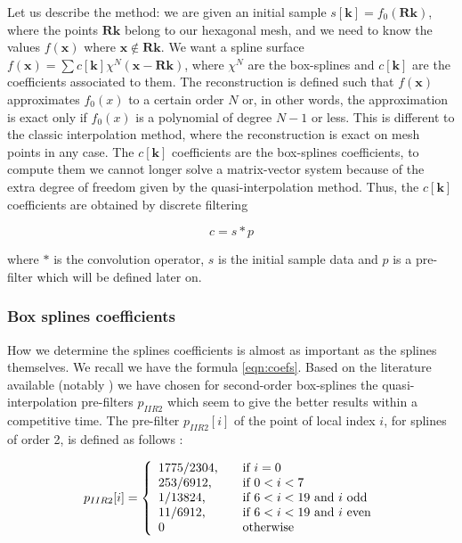 \documentclass[proc]{edpsmath}
\begin{document}
Let us describe the method: we are given an initial sample $s[\mathbf{k}] = f_0(\mathbf{R} \mathbf{k})$, where the points $\mathbf{R} \mathbf{k}$ belong to our hexagonal mesh, and we need to know the values $f(\mathbf{x})$ where $\mathbf{x} \notin \mathbf{R} \mathbf{k}$. We want a spline surface $f(\mathbf{x}) = \sum c[\mathbf{k}] \chi^N(\mathbf{x} - \mathbf{R}\mathbf{k})$, where $\chi^N$ are the box-splines and $c[\mathbf{k}]$ are the coefficients associated to them. The reconstruction is defined such that $f(\mathbf{x})$ approximates $f_0(x)$ to a certain order $N$ or, in other words, the approximation is exact only if $f_0(x)$ is a polynomial of degree $N-1$ or less. This is different to the classic interpolation method, where the reconstruction is exact on mesh points in any case. The $c[\mathbf{k}]$ coefficients are the box-splines coefficients, to compute them we cannot longer solve a matrix-vector system because of the extra degree of freedom given by the quasi-interpolation method. Thus, the  $c[\mathbf{k}]$ coefficients are obtained by discrete filtering\cite{Condat2006a}

\begin{equation}
\label{eqn:coefs}
 c = s * p
\end{equation}

where $*$ is the convolution operator, $s$ is the initial sample data and $p$ is a pre-filter which will be defined later on.


\subsubsection{Box splines coefficients}

How we determine the splines coefficients is almost as important as the splines themselves. We recall we have the formula \eqref{eqn:coefs}. Based on the literature available (notably \cite{Condat2007}) we have chosen for second-order box-splines the quasi-interpolation pre-filters $p_{IIR2}$ which seem to give the better results within a competitive time. The pre-filter $p_{IIR2}[i]$ of the point of local index $i$, for splines of order 2, is defined as follows : 


\begin{equation}
\label{eqn:filterIIR2}
p_{IIR2} [i] = \left\{
  \begin{array}{l l}
    1775/2304\text{,} & \quad \text{if } i = 0\\
    253/6912\text{,} & \quad \text{if } 0<i<7\\
    1/13824\text{,} & \quad \text{if } 6<i<19 \text{ and $i$ odd}\\
    11/6912\text{,} & \quad \text{if } 6<i<19 \text{ and $i$ even}\\
    0 & \quad \text{otherwise}
  \end{array} \right.
\end{equation}
\end{document}
